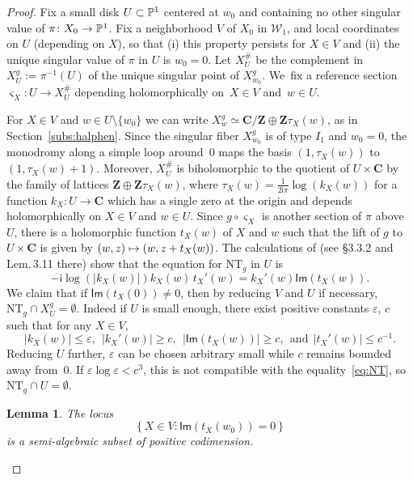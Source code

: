 \documentclass[11pt]{article}
\newcommand\mto{\mathchoice{\longmapsto}{\mapsto}{\mapsto}{\mapsto}}
\let\sep :
\let\e\varepsilon
\newcommand{\set}[1]{\left\{#1\right\}}
\newcommand{\abs}[1]{\left\vert#1\right\vert}
\newcommand{\unsur}[1]{\frac{1}{#1}}
\newcommand{\inv}{^{-1}}
\def\C{\mathbf{C}}
\def\Z{\mathbf{Z}}
\newcommand{\cW}{\mathcal{W}}
\newcommand\ii{{\mathsf{i}}}
\newcommand{\Ima}{{\mathsf{Im}}}
\theoremstyle{plain}
\newtheorem{lem}[thm]{Lemma}
\theoremstyle{definition}
\numberwithin{equation}{section}
\begin{document}
\begin{proof}
Fix a small disk $U\subset \P^1$ centered at $w_0$ and containing no other singular value of $\pi\colon X_0\to \P^1$.
Fix a neighborhood $V$ of $X_0$ in $ \cW_1$, and local coordinates on $U$ (depending on $X$), so that (i) this property persists for $X\in V$ and (ii) the unique singular value of $\pi$ in $U$ is $w_0=0$. Let
$X^\#_U $ be the complement in $X_U^g:=\pi\inv(U)$ of the unique singular point of $X_{w_0}^g$. We~fix a reference section $\varsigma_X:U\to X^\#_U$ depending holomorphically on~$X\in V$ and~$w\in U$.

For $X\in V$ and $w\in U\setminus\{w_0\}$ we can write
$X_w^g\simeq \C/\Z\oplus \Z\tau_X(w)$, as in Section~\ref{subs:halphen}. Since the singular fiber $X_{w_0}^g$ is of type $I_1$ and $w_0=0$, the monodromy along a simple loop around~$0$ maps the basis $(1, \tau_X(w))$ to $(1, \tau_X(w)+1)$. Moreover,
$X^\#_U$ is biholomorphic to the quotient of $U\times \C$ by the family of lattices
$\Z\oplus \Z\tau_X(w)$, where $\tau_X(w) = \unsur{2\ii \pi} \log (k_X(w))$ for a function $k_X\colon U\to \C$ which has a single zero at the origin and depends holomorphically on $X\in V$ and $w\in U$.
Since
$g\circ \varsigma_X$ is another section of $\pi$ above $U$, there is a holomorphic function $t_X(w)$
of $X$ and $w$ such that the lift of $g$ to $U\times \C$ is given by $(w, z)\mto (w, z+ t_X(w))$.
The calculations of \cite{invariant}
(see \S 3.3.2 and Lem.\,3.11 there) show that the equation for $\mathrm{NT}_g$ in $U$ is
\begin{equation}\label{eq:NT}
- \ii \log(\abs{k_X(w)}) k_X(w) \, t_X'(w) = k_X'(w) \Ima(t_X(w)).
\end{equation}
We claim that if $\Ima(t_X(0)) \neq 0$, then by reducing $V$ and $U$ if necessary,
$\mathrm{NT}_g\cap X_U^g = \emptyset$. Indeed if $U$ is small enough,
there exist positive constants $\e$, $c$ such that for any $X\in V$,
\begin{equation*}
\abs{k_X(w)}\leq \e, \;\, \abs{k_X'(w)}\geq c, \;\,
\abs{\Ima(t_X(w))}\geq c, \;\, {\text{and}} \;\, \abs{t_X'(w)}\leq c\inv.
\end{equation*}
Reducing $U$ further,
$\e$ can be chosen arbitrary small while
$c$ remains bounded away from~$0$. If $\e\log\e < c^3$, this is not
compatible with the equality~\eqref{eq:NT}, so $\mathrm{NT}_g\cap U = \emptyset$.

\begin{lem}\label{lem:twisting_singular}
The locus
\begin{equation}\label{eq:analytic_equation}
\set{X\in V\sep \Ima(t_X(w_0)) = 0}
\end{equation}
is a semi-algebraic subset of positive codimension.
\end{lem}


\end{proof}
\end{document}
